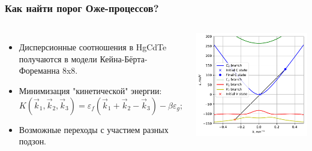 \documentclass[9pt,pdf]{beamer}
\begin{document}
    \begin{frame}
        \frametitle{Как найти порог Оже-процессов?}
        \begin{columns}
            \begin{itemize}
                \item Дисперсионные соотношения в HgCdTe получаются 
                  в модели Кейна-Бёрта-Фореманна 8x8.
                \item Минимизация "кинетической" энергии:
                  \begin{equation*}
                    K(\vec{k}_{1}, \vec{k}_{2}, \vec{k}_{3}) = 
                    \varepsilon_{f}(\vec{k}_{1} + \vec{k}_{2} - \vec{k}_{3}) - \beta \varepsilon_g;
                  \end{equation*}
    
                  \item Возможные переходы с участием разных подзон.
            \end{itemize}
            
            \begin{center}
              \includegraphics[width=\textwidth]{./images/add_pic.pdf}
            \end{center}
        \end{columns}
      \end{frame}
\end{document}
